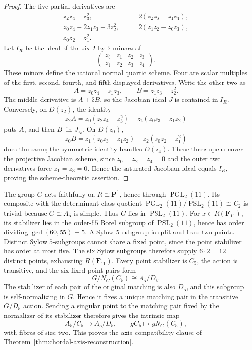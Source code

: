 \documentclass[11pt]{article}
\theoremstyle{definition}
\theoremstyle{remark}
\newcommand{\F}{\mathbf F}
\newcommand{\PP}{\mathbf P}
\newcommand{\PGL}{\operatorname{PGL}}
\begin{document}
\begin{proof}
The five partial derivatives are
\[
\begin{split}
 z_2z_4-z_3^2,&\qquad 2(z_2z_3-z_1z_4),\\
 z_0z_4+2z_1z_3-3z_2^2,&\qquad 2(z_1z_2-z_0z_3),\\
 z_0z_2-z_1^2.&
\end{split}
\]
Let \(I_R\) be the ideal of the six \(2\)-by-\(2\) minors of
\[
 \begin{pmatrix}z_0&z_1&z_2&z_3\\z_1&z_2&z_3&z_4\end{pmatrix}.
\]
These minors define the rational normal quartic scheme.  Four are scalar
multiples of the first, second, fourth, and fifth displayed derivatives.
Write the other two as
\[
 A=z_0z_4-z_1z_3,\qquad B=z_1z_3-z_2^2.
\]
The middle derivative is \(A+3B\), so the Jacobian ideal \(J\) is contained
in \(I_R\).  Conversely, on \(D(z_2)\), the identity
\[
 z_2A=z_0(z_2z_4-z_3^2)+z_3(z_0z_3-z_1z_2)
\]
puts \(A\), and then \(B\), in \(J_{z_2}\).  On \(D(z_0)\),
\[
 z_0B=z_1(z_0z_3-z_1z_2)-z_2(z_0z_2-z_1^2)
\]
does the same; the symmetric identity handles \(D(z_4)\).  These three
opens cover the projective Jacobian scheme, since \(z_0=z_2=z_4=0\) and the
outer two derivatives force \(z_1=z_3=0\).  Hence the saturated Jacobian
ideal equals \(I_R\), proving the scheme-theoretic assertion.
\end{proof}

The group \(G\) acts faithfully on \(R\cong\PP^1\), hence through
\(\PGL_2(11)\).  Its composite with the determinant-class quotient
\(\PGL_2(11)/\operatorname{PSL}_2(11)\cong C_2\) is trivial because
\(G\cong A_5\) is simple.  Thus \(G\) lies in
\(\operatorname{PSL}_2(11)\).  For \(x\in R(\F_{11})\), its
stabilizer lies in the
order-\(55\) Borel subgroup of \(\operatorname{PSL}_2(11)\), hence has order
dividing \(\gcd(60,55)=5\).  A Sylow \(5\)-subgroup is split and fixes two
points.  Distinct Sylow \(5\)-subgroups cannot share a fixed point, since
the point stabilizer has order at most five.  The six Sylow subgroups
therefore supply \(6\cdot2=12\) distinct points, exhausting \(R(\F_{11})\).
Every point stabilizer is \(C_5\), the action is transitive, and the six
fixed-point pairs form
\[
 G/N_G(C_5)\cong A_5/D_5.
\]
The stabilizer of each pair of the original matching is also \(D_5\), and
this subgroup is self-normalizing in \(G\).  Hence it fixes a unique matching
pair in the transitive \(G/D_5\) action.  Sending a singular point
to the matching pair fixed by the normalizer of its stabilizer therefore
gives the intrinsic map
\[
 A_5/C_5\longrightarrow A_5/D_5,
 \qquad gC_5\longmapsto gN_G(C_5),
\]
with fibres of size two.  This proves the axis-compatibility clause of
Theorem~\ref{thm:chordal-axis-reconstruction}.
\end{document}
